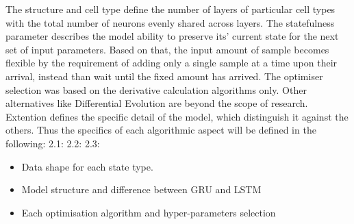 %
%
The structure and cell type define the number of layers of particular cell types with the total number of neurons evenly shared across layers.
The statefulness parameter describes the model ability to preserve its' current state for the next set of input parameters.
Based on that, the input amount of sample becomes flexible by the requirement of adding only a single sample at a time upon their arrival, instead than wait until the fixed amount has arrived.
The optimiser selection was based on the derivative calculation algorithms only.
Other alternatives like Differential Evolution are beyond the scope of research.
Extention defines the specific detail of the model, which distinguish it against the others.
Thus the specifics of each algorithmic aspect will be defined in the following:
2.1: 
2.2: 
2.3: 
\begin{itemize}
    \item Data shape for each state type. 
    \item Model structure and difference between GRU and LSTM
    \item Each optimisation algorithm and hyper-parameters selection
\end{itemize}
	
%
%
